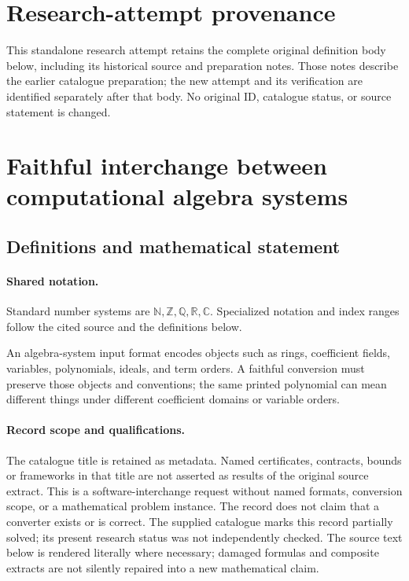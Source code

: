 \documentclass[11pt]{article}
\begin{document}
\section*{Research-attempt provenance}
This standalone research attempt retains the complete original definition body below,
including its historical source and preparation notes. Those notes describe the
earlier catalogue preparation; the new attempt and its verification are identified
separately after that body. No original ID, catalogue status, or source statement is changed.

\section{Faithful interchange between computational algebra systems}\label{statement}

\subsection{Definitions and mathematical statement}

\paragraph{Shared notation.}Standard number systems are $\mathbb N,\mathbb Z,\mathbb Q,\mathbb R,\mathbb C$. Specialized notation and index ranges follow the cited source and the definitions below.


An algebra-system input format encodes objects such as rings, coefficient fields, variables, polynomials, ideals, and term orders. A faithful conversion must preserve those objects and conventions; the same printed polynomial can mean different things under different coefficient domains or variable orders.
\paragraph{Record scope and qualifications.}
The catalogue title is retained as metadata. Named certificates, contracts, bounds or frameworks in that title are not asserted as results of the original source extract.
This is a software-interchange request without named formats, conversion scope, or a mathematical problem instance. The record does not claim that a converter exists or is correct. The supplied catalogue marks this record partially solved; its present research status was not independently checked.
The source text below is rendered literally where necessary; damaged formulas and composite extracts are not silently repaired into a new mathematical claim.
\end{document}
